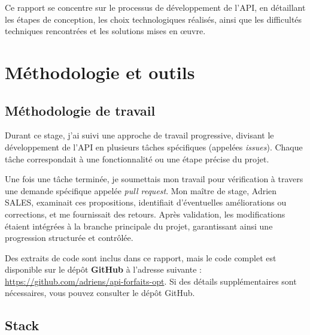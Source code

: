 \documentclass{article}
\begin{document}
	Ce rapport se concentre sur le processus de développement de l’API, en détaillant les étapes de conception, les choix technologiques réalisés, ainsi que les difficultés techniques rencontrées et les solutions mises en œuvre.
	
	\newpage
	\section{Méthodologie et outils}
	
	\subsection{Méthodologie de travail}
	
	Durant ce stage, j'ai suivi une approche de travail progressive, divisant le développement de l'API en plusieurs tâches spécifiques (appelées \textit{issues}). Chaque tâche correspondait à une fonctionnalité ou une étape précise du projet.
	
	Une fois une tâche terminée, je soumettais mon travail pour vérification à travers une demande spécifique appelée \textit{pull request}. Mon maître de stage, Adrien SALES, examinait ces propositions, identifiait d'éventuelles améliorations ou corrections, et me fournissait des retours. Après validation, les modifications étaient intégrées à la branche principale du projet, garantissant ainsi une progression structurée et contrôlée.
	
	Des extraits de code sont inclus dans ce rapport, mais le code complet est disponible sur le dépôt \textbf{GitHub} à l'adresse suivante : \url{https://github.com/adriens/api-forfaits-opt}. Si des détails supplémentaires sont nécessaires, vous pouvez consulter le dépôt GitHub.
	
	\subsection{Stack}
	
\end{document}
